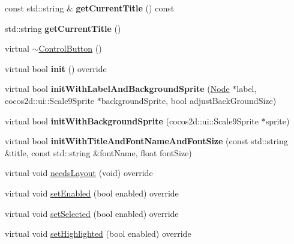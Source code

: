 \begin{DoxyCompactItemize}
\mbox{\label{classControlButton_abd2957b55acdb4eb6403c100e8fa6746}} 
const std\+::string \& {\bfseries get\+Current\+Title} () const
\item 
\mbox{\label{classControlButton_a142686419015efadb6ae6325f9370502}} 
std\+::string {\bfseries get\+Current\+Title} ()
\item 
virtual \hyperlink{classControlButton_a17bbca4cc135ca862eb6a71dd406af88}{$\sim$\+Control\+Button} ()
\item 
\mbox{\label{classControlButton_a3a8aee40681813d5adf76a189b85da1a}} 
virtual bool {\bfseries init} () override
\item 
\mbox{\label{classControlButton_a1286e90d92a8b487119b4b33b4dadcad}} 
virtual bool {\bfseries init\+With\+Label\+And\+Background\+Sprite} (\hyperlink{classNode}{Node} $\ast$label, cocos2d\+::ui\+::\+Scale9\+Sprite $\ast$background\+Sprite, bool adjust\+Back\+Ground\+Size)
\item 
\mbox{\label{classControlButton_a95b5548dac94edfd862f6c974cde39ed}} 
virtual bool {\bfseries init\+With\+Background\+Sprite} (cocos2d\+::ui\+::\+Scale9\+Sprite $\ast$sprite)
\item 
\mbox{\label{classControlButton_ace70e31e32565fa764f7c784380be59a}} 
virtual bool {\bfseries init\+With\+Title\+And\+Font\+Name\+And\+Font\+Size} (const std\+::string \&title, const std\+::string \&font\+Name, float font\+Size)
\item 
virtual void \hyperlink{classControlButton_af0fc9343439e52c30c72a87183807487}{needs\+Layout} (void) override
\item 
virtual void \hyperlink{classControlButton_ac3515c2c94586676696d73d48e5ab08f}{set\+Enabled} (bool enabled) override
\item 
virtual void \hyperlink{classControlButton_a13c5ecf7e0d2d6ac420dc9d6b6bba24b}{set\+Selected} (bool enabled) override
\item 
virtual void \hyperlink{classControlButton_a534815c8b3462f04f39cfd1c2ba98645}{set\+Highlighted} (bool enabled) override
\item 
\mbox{\label{classControlButton_acd38bbfbb2449610b82d9ec39b454e0a}} 

\end{DoxyCompactItemize}
